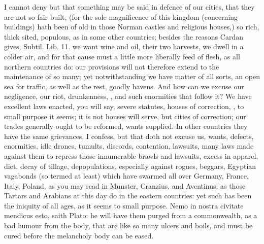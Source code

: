 {I cannot deny but that something may be said in defence of our cities,
that they are not so fair built, (for the sole magnificence of
this kingdom (concerning buildings) hath been of old in those Norman
castles and religious houses,) so rich, thick sited, populous, as in
some other countries; besides the reasons Cardan gives, Subtil. Lib.
11. we want wine and oil, their two harvests, we dwell in a colder air,
and for that cause must a little more liberally feed of flesh, as
all northern countries do: our provisions will not therefore extend to
the maintenance of so many; yet notwithstanding we have matter of all
sorts, an open sea for traffic, as well as the rest, goodly havens. And
how can we excuse our negligence, our riot, drunkenness, \etc{}, and such
enormities that follow it? We have excellent laws enacted, you will
say, severe statutes, houses of correction, \etc{}, to small purpose it
seems; it is not houses will serve, but cities of correction; our
trades generally ought to be reformed, wants supplied. In other
countries they have the same grievances, I confess, but that doth not
excuse us, wants, defects, enormities, idle drones, tumults,
discords, contention, lawsuits, many laws made against them to repress
those innumerable brawls and lawsuits, excess in apparel, diet, decay
of tillage, depopulations, especially against rogues, beggars,
Egyptian vagabonds (so termed at least) which have  swarmed all
over Germany, France, Italy, Poland, as you may read in  Munster,
Cranzius, and Aventinus; as those Tartars and Arabians at this day do
in the eastern countries: yet such has been the iniquity of all ages,
as it seems to small purpose. Nemo in nostra civitate mendicus esto,
 saith Plato: he will have them purged from a commonwealth,
as a bad humour from the body, that are like so many ulcers and
boils, and must be cured before the melancholy body can be eased.

}
